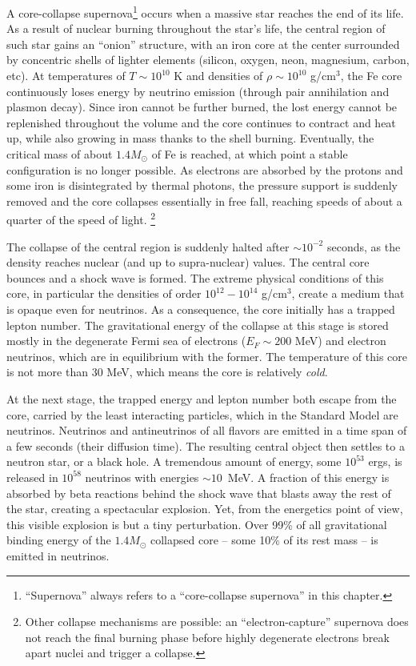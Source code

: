 A core-collapse supernova\footnote{``Supernova'' always
  refers to a ``core-collapse supernova'' in this chapter.} occurs when a massive star reaches the end of its
life. As a result of nuclear burning throughout the star's life, the central region of such star gains an ``onion'' structure, with an iron core at the center surrounded by concentric shells of lighter elements (silicon, oxygen, neon, magnesium, carbon, etc). At temperatures of $T\sim 10^{10}$ K and densities of $\rho \sim 10^{10}$ g/cm$^{3}$, the Fe core continuously loses energy by neutrino emission (through pair annihilation and plasmon decay). Since iron cannot be further burned, the lost energy cannot be replenished throughout the volume and the core continues to contract and heat up, while also growing in mass thanks to the shell burning. Eventually, the critical mass of about $1.4 M_{\odot}$ of Fe is reached, at which point a stable configuration is no longer possible. As electrons are absorbed by the protons and some iron is disintegrated by thermal photons, the pressure support is suddenly removed and the core collapses essentially in free fall, reaching speeds of about a quarter of the speed of light. 
\footnote{Other collapse mechanisms are possible: an ``electron-capture'' supernova does not reach the final burning phase before highly degenerate electrons break apart nuclei and trigger a collapse.}

The collapse of the central region is suddenly halted after $\sim 10^{-2}$ seconds, as the density reaches nuclear (and up to supra-nuclear)  values. The central core bounces and a shock wave is formed. The extreme physical conditions of this core, in particular the densities of order $10^{12}-10^{14}$ g/cm$^{3}$, create a medium that is opaque even for neutrinos. As a consequence, the core initially has a trapped lepton number. The gravitational energy of the collapse at this stage is stored mostly in the degenerate Fermi sea of electrons ($E_{F}\sim 200$ MeV) and electron neutrinos, which are in equilibrium with the former. The temperature of this core is not more than 30 MeV, which means the core is relatively \emph{cold}. 

At the next stage, the trapped energy and lepton number both escape from the core, carried by the least interacting particles, which in the Standard Model are neutrinos.  Neutrinos and antineutrinos of all flavors are emitted in a time span of a few seconds (their diffusion time). The resulting central object then settles to a neutron star, or a black hole. A tremendous amount of energy, some $10^{53}$ ergs, is released in $10^{58}$ neutrinos with energies $\sim 10$~MeV. A fraction of this energy is absorbed by beta reactions behind the shock wave that blasts away the rest of the star, creating a spectacular explosion.
Yet, from the energetics point of view, this visible explosion is but a tiny perturbation. Over 99\% of all gravitational binding energy of the $1.4 M_{\odot}$ collapsed core -- some 10\% of its rest mass -- is emitted in neutrinos. 

